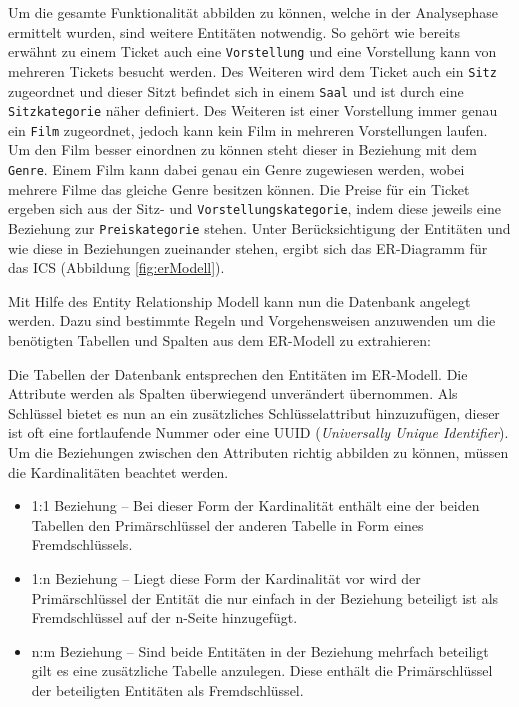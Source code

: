 		Um die gesamte Funktionalität abbilden zu können, welche in der Analysephase ermittelt wurden, sind weitere Entitäten notwendig. So gehört wie bereits erwähnt zu einem Ticket auch eine \texttt{Vorstellung} und eine Vorstellung kann von mehreren Tickets besucht werden. Des Weiteren wird dem Ticket auch ein \texttt{Sitz} zugeordnet und dieser Sitzt befindet sich in einem \texttt{Saal} und ist durch eine \texttt{Sitzkategorie} näher definiert. Des Weiteren ist einer Vorstellung immer genau ein \texttt{Film} zugeordnet, jedoch kann kein Film in mehreren Vorstellungen laufen. Um den Film besser einordnen zu können steht dieser in Beziehung mit dem \texttt{Genre}. Einem Film kann dabei genau ein Genre zugewiesen werden, wobei mehrere Filme das gleiche Genre besitzen können. Die Preise für ein Ticket ergeben sich aus der Sitz- und \texttt{Vorstellungskategorie}, indem diese jeweils eine Beziehung zur \texttt{Preiskategorie} stehen. 
		Unter Berücksichtigung der Entitäten und wie diese in Beziehungen zueinander stehen, ergibt sich das ER-Diagramm für das \ac{ICS} (Abbildung  \ref{fig:erModell}).
		
		Mit Hilfe des Entity Relationship Modell kann nun die Datenbank angelegt werden. Dazu sind bestimmte Regeln und Vorgehensweisen anzuwenden um die benötigten Tabellen und Spalten aus dem ER-Modell zu extrahieren:
				
				Die Tabellen der Datenbank entsprechen den Entitäten im ER-Modell. Die Attribute werden als Spalten überwiegend unverändert übernommen. Als Schlüssel bietet es nun an ein zusätzliches Schlüsselattribut hinzuzufügen, dieser ist oft eine fortlaufende Nummer oder eine UUID (\textit{Universally Unique Identifier}). Um die Beziehungen zwischen den Attributen richtig abbilden zu können, müssen die Kardinalitäten beachtet werden. 
				\begin{itemize}
					\item 1:1 Beziehung -- Bei dieser Form der Kardinalität enthält eine der beiden Tabellen den Primärschlüssel der anderen Tabelle in Form eines Fremdschlüssels.
					\item 1:n Beziehung -- Liegt diese Form der Kardinalität vor wird der Primärschlüssel der Entität die nur einfach in der Beziehung beteiligt ist als Fremdschlüssel auf der n-Seite hinzugefügt. 
					\item n:m Beziehung -- Sind beide Entitäten in der Beziehung mehrfach beteiligt gilt es eine zusätzliche Tabelle anzulegen. Diese enthält die Primärschlüssel der beteiligten Entitäten als Fremdschlüssel.
				\end{itemize}
		
